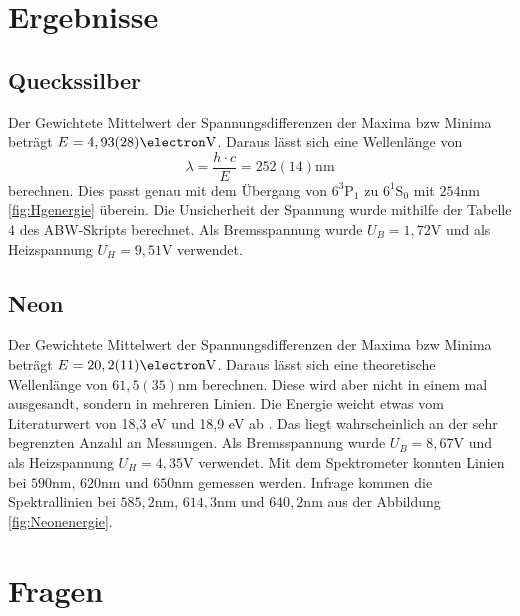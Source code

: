 \documentclass[11pt, a4paper]{article}
\begin{document}
    \section{Ergebnisse}

    \subsection{Queckssilber}

    Der Gewichtete Mittelwert der Spannungsdifferenzen der Maxima bzw Minima beträgt $E = 4,93(28) \si{\electron\volt}$. Daraus lässt sich eine Wellenlänge von 
    \begin{equation}
        \lambda = \frac{h \cdot c}{E} = 252(14) \si{\nano\meter}
    \end{equation}
    berechnen. Dies passt genau mit dem Übergang von $6^3\text{P}_1$ zu $6^1\text{S}_0$ mit $254 \si{\nano\meter}$ \ref{fig:Hgenergie} überein.
    Die Unsicherheit der Spannung wurde mithilfe der Tabelle 4 des ABW-Skripts \cite{ABW} berechnet. Als Bremsspannung wurde $U_B = 1,72 \si{\volt}$ und als Heizspannung $U_H = 9,51 \si{\volt}$ verwendet.

    \subsection{Neon}

    Der Gewichtete Mittelwert der Spannungsdifferenzen der Maxima bzw Minima beträgt $E = 20,2(11) \si{\electron\volt}$. Daraus lässt sich eine theoretische Wellenlänge von $61,5(35) \si{\nano\meter}$ berechnen. Diese wird aber nicht in einem mal ausgesandt, sondern in mehreren Linien. Die Energie weicht etwas vom Literaturwert von 18,3 eV und 18,9 eV ab \cite{FHV}. Das liegt wahrscheinlich an der sehr begrenzten Anzahl an Messungen.
    Als Bremsspannung wurde $U_B = 8,67 \si{\volt}$ und als Heizspannung $U_H = 4,35 \si{\volt}$ verwendet.
    Mit dem Spektrometer konnten Linien bei $590 \si{\nano\meter}$, $620 \si{\nano\meter}$ und $650 \si{\nano\meter}$ gemessen werden. Infrage kommen die Spektrallinien bei $585,2 \si{\nano\meter}$, $614,3 \si{\nano\meter}$ und $640,2 \si{\nano\meter}$ aus der Abbildung \ref{fig:Neonenergie}.

    \section{Fragen}
\end{document}
